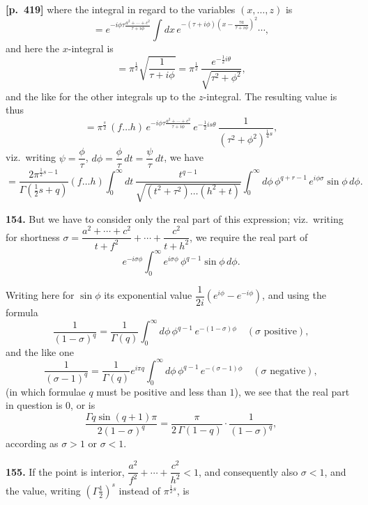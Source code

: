 \documentclass[11pt,a4paper]{article}
\begin{document}
\bigskip
\noindent\textbf{[p.~419]}\quad
where the integral in regard to the variables $(x,\ldots,z)$ is
\[
= e^{-i\phi\tau\frac{a^{2}+\cdots+c^{2}}{\tau+i\phi}}\int dx\,e^{-(\tau+i\phi)\left(x - \frac{\tau a}{\tau+i\phi}\right)^{2}}\cdots,
\]
and here the $x$-integral is
\[
= \pi^{\tfrac{1}{2}}\sqrt{\frac{1}{\tau + i\phi}} = \pi^{\tfrac{1}{2}}\,\frac{e^{-\tfrac{1}{2}i\theta}}{\sqrt{\tau^{2}+\phi^{2}}},
\]
and the like for the other integrals up to the $z$-integral. The resulting value is thus
\[
= \pi^{\tfrac{s}{2}}\,(f\ldots h)\,e^{-i\phi\tau\frac{a^{2}+\cdots+c^{2}}{\tau+i\phi}}\,e^{-\tfrac{1}{2}is\theta}\,\frac{1}{(\tau^{2}+\phi^{2})^{\tfrac{1}{4}s}},
\]
viz.\ writing $\psi = \dfrac{\phi}{\tau}$, $d\phi = \dfrac{\phi}{\tau}\,dt = \dfrac{\psi}{\tau}\,dt$, we have
\[
= \frac{2\pi^{\tfrac{1}{2}s-1}}{\Gamma(\tfrac{1}{2}s+q)}(f\ldots h)\int_{0}^{\infty} dt\,\frac{t^{q-1}}{\sqrt{(t^{2}+\tau^{2})\ldots(h^{2}+t)}}\int_{0}^{\infty} d\phi\,\phi^{q+r-1}\,e^{i\phi\sigma}\sin\phi\,d\phi.
\]

\textbf{154.} But we have to consider only the real part of this expression; viz.\ writing for shortness $\sigma = \dfrac{a^{2}+\cdots+c^{2}}{t+f^{2}} + \cdots + \dfrac{c^{2}}{t+h^{2}}$, we require the real part of
\[
e^{-i\sigma\phi}\int_{0}^{\infty} e^{i\sigma\phi}\,\phi^{q-1}\sin\phi\,d\phi.
\]

Writing here for $\sin\phi$ its exponential value $\dfrac{1}{2i}(e^{i\phi} - e^{-i\phi})$, and using the formula
\[
\frac{1}{(1-\sigma)^{q}} = \frac{1}{\Gamma(q)}\int_{0}^{\infty} d\phi\,\phi^{q-1}\,e^{-(1-\sigma)\phi}\quad(\sigma\text{ positive}),
\]
and the like one
\[
\frac{1}{(\sigma-1)^{q}} = \frac{1}{\Gamma(q)}e^{i\pi q}\int_{0}^{\infty} d\phi\,\phi^{q-1}\,e^{-(\sigma-1)\phi}\quad(\sigma\text{ negative}),
\]
(in which formulae $q$ must be positive and less than $1$), we see that the real part in question is $0$, or is
\[
\frac{\Gamma q\sin(q+1)\pi}{2(1-\sigma)^{q}} = \frac{\pi}{2\,\Gamma(1-q)}\cdot\frac{1}{(1-\sigma)^{q}},
\]
according as $\sigma > 1$ or $\sigma < 1$.

\textbf{155.} If the point is interior, $\dfrac{a^{2}}{f^{2}} + \cdots + \dfrac{c^{2}}{h^{2}} < 1$, and consequently also $\sigma < 1$, and the value, writing $(\Gamma\tfrac{1}{2})^{s}$ instead of $\pi^{\tfrac{1}{2}s}$, is
\end{document}
